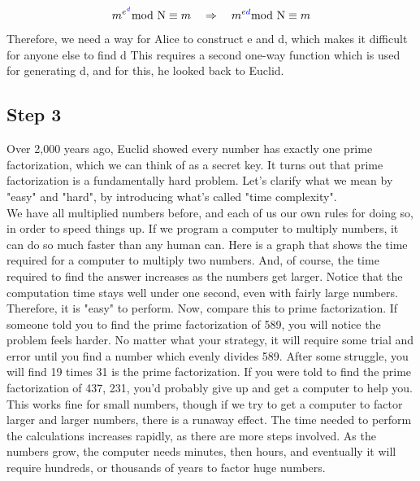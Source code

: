 \documentclass{report}
\begin{document}
$$m^{e^{\color{blue}d}} \text{mod N} \equiv m \quad \Rightarrow \quad m^{e\color{blue}d} \text{mod N} \equiv m$$
Therefore, we need a way for Alice to construct e and d, which makes it difficult for anyone else to find d This requires a second one-way function which is used for generating d, and for this, he looked back to Euclid.


\subsection{Step 3}

Over 2,000 years ago, Euclid showed every number has exactly one prime factorization, which we can think of as a secret key. It turns out that prime factorization is a fundamentally hard problem. Let's clarify what we mean by "easy" and "hard", by introducing what's called "time complexity". \\
We have all multiplied numbers before, and each of us our own rules for doing so, in order to speed things up. If we program a computer to multiply numbers, it can do so much faster than any human can. Here is a graph that shows the time required for a computer to multiply two numbers. And, of course, the time required to find the answer increases as the numbers get larger. Notice that the computation time stays well under one second, even with fairly large numbers. Therefore, it is "easy" to perform. Now, compare this to prime factorization. If someone told you to find the prime factorization of 589, you will notice the problem feels harder. No matter what your strategy, it will require some trial and error until you find a number which evenly divides 589. After some struggle, you will find 19 times 31 is the prime factorization. If you were told to find the prime factorization of 437, 231, you'd probably give up and get a computer to help you. This works fine for small numbers, though if we try to get a computer to factor larger and larger numbers, there is a runaway effect. The time needed to perform the calculations increases rapidly, as there are more steps involved. As the numbers grow, the computer needs minutes, then hours, and eventually it will require hundreds, or thousands of years to factor huge numbers.
\end{document}
